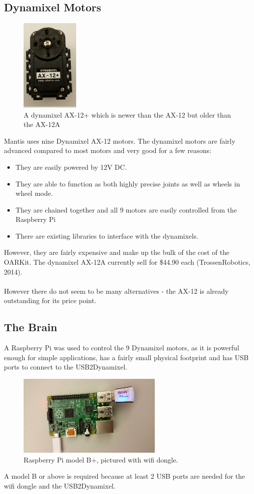 \documentclass[]{article}
\begin{document}
\subsection{Dynamixel Motors}
\begin{figure}[H]
\centering
\includegraphics[width=80pt]{report_images/dynamixel.jpg}
\caption{A dynamixel AX-12+ which is newer than the AX-12 but older than the AX-12A}
\end{figure}
Mantis uses nine Dynamixel AX-12 motors. The dynamixel motors are fairly advanced compared to most motors and very good for a few reasons:
\begin{itemize}
  \item They are easily powered by 12V DC.
  \item They are able to function as both highly precise joints as well as wheels in wheel mode.
  \item They are chained together and all 9 motors are easily controlled from the Raspberry Pi
  \item There are existing libraries to interface with the dynamixels.
\end{itemize}
However, they are fairly expensive and make up the bulk of the cost of the OARKit. The dynamixel AX-12A currently sell for \$44.90 each (TrossenRobotics, 2014).
\\
\\
However there do not seem to be many alternatives - the AX-12 is already outstanding for its price point.

\subsection{The Brain}
A Raspberry Pi was used to control the 9 Dynamixel motors, as it is powerful enough for simple applications, has a fairly small physical footprint and has USB ports to connect to the USB2Dynamixel.
\begin{figure}[H]
\centering
\includegraphics[width=200pt]{report_images/pi.jpg}
\caption{Raspberry Pi model B+, pictured with wifi dongle.}
\end{figure}
A model B or above is required because at least 2 USB ports are needed for the wifi dongle and the USB2Dynamixel.
\end{document}
